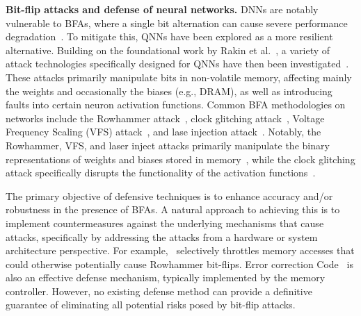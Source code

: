 \noindent
{\bf Bit-flip attacks and defense of neural networks.}
DNNs are notably vulnerable to BFAs, where a single bit alternation can cause severe performance degradation~\cite{HONG_USENIX19,SURVEY,liyes}. To mitigate this, QNNs have been explored as a more resilient alternative. Building on the foundational work by Rakin et al.~\cite{BFAICCV19}, a variety of attack technologies specifically designed for QNNs have then been investigated~\cite{DONTKNOCK,PRACTICALATTACK,SPARSEBFA,glitchinjection}. These attacks primarily manipulate bits in non-volatile memory, affecting mainly the weights and occasionally the biases (e.g., DRAM), as well as introducing faults into certain neuron activation functions. Common BFA methodologies on networks include the Rowhammer attack~\cite{ROWHAMMER,BFAICCV19,DONTKNOCK}, clock glitching attack~\cite{PRACTICALATTACK}, Voltage Frequency Scaling (VFS) attack~\cite{VFSBFA}, and lase injection attack~\cite{ovrvwlaser}. Notably, the Rowhammer, VFS, and laser inject attacks primarily manipulate the binary representations of weights and biases stored in memory~\cite{BFAICCV19,1bitallyouneed,DONTKNOCK,SPARSEBFA,VFSBFA}, while the clock glitching attack specifically disrupts the functionality of the activation functions~\cite{PRACTICALATTACK,glitchinjection}.

The primary objective of defensive techniques is to enhance accuracy and/or robustness in the presence of BFAs. A natural approach to achieving this is to implement countermeasures against the underlying mechanisms that cause attacks, specifically by addressing the attacks from a hardware or system architecture perspective. For example,~\cite{yauglikcci2021blockhammer} selectively throttles memory accesses that could otherwise potentially cause Rowhammer bit-flips. Error correction Code~\cite{cojocar2019exploiting,di2023copy} is also an effective defense mechanism, typically implemented by the memory controller. 
% 
However, no existing defense method can provide a definitive guarantee of eliminating all potential risks posed by bit-flip attacks.
\vspace{2mm}

